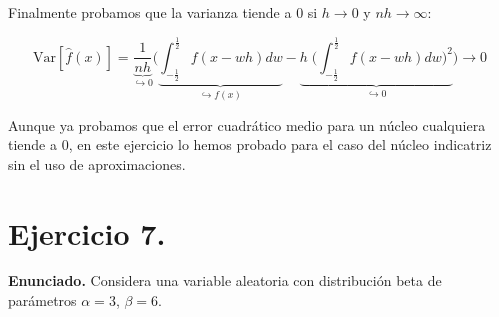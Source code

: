 \documentclass[a4paper]{article}
\newcommand{\Var}{\text{Var}}
\begin{document}
Finalmente probamos que la varianza tiende a $0$ si $h \rightarrow 0$ y $nh \rightarrow \infty$:

\[
	\Var [ \hat f(x)] = \underbrace{\frac{1}{n h}}_{\hookrightarrow 0} \bigg( \underbrace{\int_{-\frac{1}{2}}^{\frac{1}{2}} f(x - wh) dw}_{\hookrightarrow f(x)} - \underbrace{h \; \bigg( \int_{-\frac{1}{2}}^{\frac{1}{2}} f(x - wh) dw\bigg) ^2}_{\hookrightarrow 0} \bigg)
	\longrightarrow 0
\]

Aunque ya probamos que el error cuadrático medio para un núcleo cualquiera tiende a $0$, en este ejercicio lo hemos probado para el caso del núcleo indicatriz sin el uso de aproximaciones.

\section*{Ejercicio 7.}

\textbf{Enunciado.} Considera una variable aleatoria con distribución beta de parámetros $\alpha = 3$, $\beta = 6$.
\end{document}
